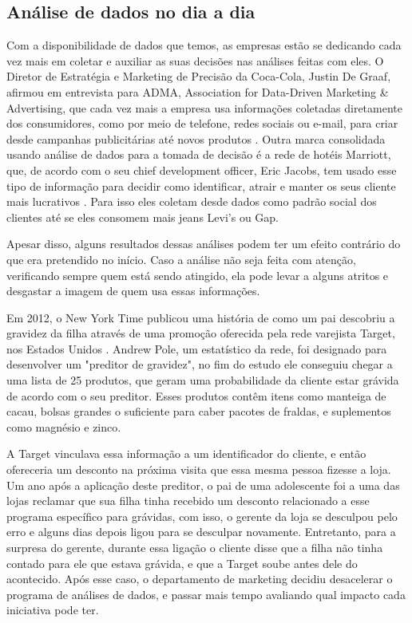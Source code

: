\subsection{Análise de dados no dia a dia}

\indent
\par Com a disponibilidade de dados que temos, as empresas estão se dedicando cada vez mais em coletar e auxiliar as suas decisões nas análises feitas com eles. O Diretor de Estratégia e Marketing de Precisão da Coca-Cola, Justin De Graaf, afirmou em entrevista para ADMA, Association for Data-Driven Marketing \& Advertising, que cada vez mais a empresa usa informações coletadas diretamente dos consumidores, como por meio de telefone, redes sociais ou e-mail, para criar desde campanhas publicitárias até novos produtos \cite{Tan2017}. Outra marca consolidada usando análise de dados para a tomada de decisão é a rede de hotéis Marriott, que, de acordo com o seu chief development officer, Eric Jacobs, tem usado esse tipo de informação para decidir como identificar, atrair e manter os seus cliente mais lucrativos \cite{Eisen2018}. Para isso eles coletam desde dados como padrão social dos clientes até se eles consomem mais jeans Levi's ou Gap.

\par Apesar disso, alguns resultados dessas análises podem ter um efeito contrário do que era pretendido no início. Caso a análise não seja feita com atenção, verificando sempre quem está sendo atingido, ela pode levar a alguns atritos e desgastar a imagem de quem usa essas informações.

\par Em 2012, o New York Time publicou uma história de como um pai descobriu a gravidez da filha através de uma promoção oferecida pela rede varejista Target, nos Estados Unidos \cite{Duhigg2012}. Andrew Pole, um estatístico da rede, foi designado para desenvolver um "preditor de gravidez", no fim do estudo ele conseguiu chegar a uma lista de 25 produtos, que geram uma probabilidade da cliente estar grávida de acordo com o seu preditor. Esses produtos contêm itens como manteiga de cacau, bolsas grandes o suficiente para caber pacotes de fraldas, e suplementos como magnésio e zinco.

\par A Target vinculava essa informação a um identificador do cliente, e então ofereceria um desconto na próxima visita que essa mesma pessoa fizesse a loja. Um ano após a aplicação deste preditor, o pai de uma adolescente foi a uma das lojas reclamar que sua filha tinha recebido um desconto relacionado a esse programa específico para grávidas, com isso, o gerente da loja se desculpou pelo erro e alguns dias depois ligou para se desculpar novamente. Entretanto, para a surpresa do gerente, durante essa ligação o cliente disse que a filha não tinha contado para ele que estava grávida, e que a Target soube antes dele do acontecido. Após esse caso, o departamento de marketing decidiu desacelerar o programa de análises de dados, e passar mais tempo avaliando qual impacto cada iniciativa pode ter.

